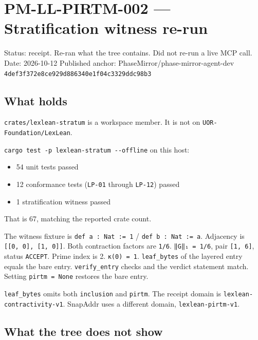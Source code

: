 \documentclass[
]{article}
\author{}
\date{}
\providecommand{\tightlist}{%
  \setlength{\itemsep}{0pt}\setlength{\parskip}{0pt}}
\begin{document}
\hypertarget{pm-ll-pirtm-002-stratification-witness-re-run}{%
\section{PM-LL-PIRTM-002 --- Stratification witness
re-run}\label{pm-ll-pirtm-002-stratification-witness-re-run}}

Status: receipt. Re-ran what the tree contains. Did not re-run a live
MCP call. Date: 2026-10-12 Published anchor:
PhaseMirror/phase-mirror-agent-dev
\texttt{4def3f372e8ce929d886340e1f04c3329ddc98b3}

\hypertarget{what-holds}{%
\subsection{What holds}\label{what-holds}}

\texttt{crates/lexlean-stratum} is a workspace member. It is not on
\texttt{UOR-Foundation/LexLean}.

\texttt{cargo\ test\ -p\ lexlean-stratum\ -\/-offline} on this host:

\begin{itemize}
\tightlist
\item
  54 unit tests passed
\item
  12 conformance tests (\texttt{LP-01} through \texttt{LP-12}) passed
\item
  1 stratification witness passed
\end{itemize}

That is 67, matching the reported crate count.

The witness fixture is \texttt{def\ a\ :\ Nat\ :=\ 1} /
\texttt{def\ b\ :\ Nat\ :=\ a}. Adjacency is
\texttt{{[}{[}0,\ 0{]},\ {[}1,\ 0{]}{]}}. Both contraction factors are
\texttt{1/6}. \texttt{‖G‖₁\ =\ 1/6}, pair \texttt{{[}1,\ 6{]}}, status
\texttt{ACCEPT}. Prime index is 2. \texttt{κ(0)\ =\ 1}.
\texttt{leaf\_bytes} of the layered entry equals the bare entry.
\texttt{verify\_entry} checks and the verdict statement match. Setting
\texttt{pirtm\ =\ None} restores the bare entry.

\texttt{leaf\_bytes} omits both \texttt{inclusion} and \texttt{pirtm}.
The receipt domain is \texttt{lexlean-contractivity-v1}. SnapAddr uses a
different domain, \texttt{lexlean-pirtm-v1}.

\hypertarget{what-the-tree-does-not-show}{%
\subsection{What the tree does not
show}\label{what-the-tree-does-not-show}}
\end{document}
